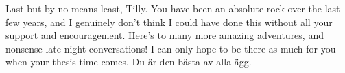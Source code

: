 \begin{acknowledgements}
    Last but by no means least, Tilly. You have been an absolute rock over the last few years, and I genuinely don't think I could have done this without all your support and encouragement. Here's to many more amazing adventures, and nonsense late night conversations! I can only hope to be there as much for you when your thesis time comes. Du \"ar den b\"asta av alla \"agg.
    
    \end{acknowledgements}
    
    